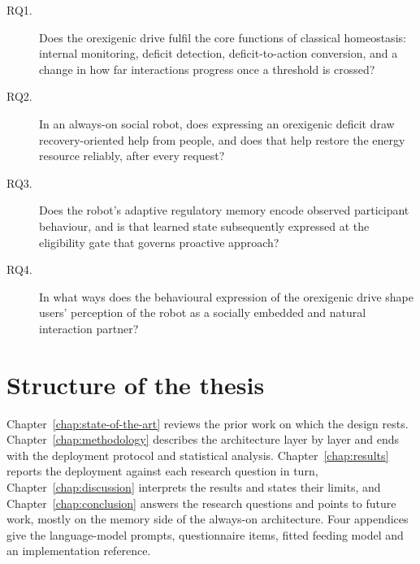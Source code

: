 \begin{description}
    \item[RQ1.] Does the orexigenic drive fulfil the core functions of classical homeostasis: internal monitoring, deficit detection, deficit-to-action conversion, and a change in how far interactions progress once a threshold is crossed?
    \item[RQ2.] In an always-on social robot, does expressing an orexigenic deficit draw recovery-oriented help from people, and does that help restore the energy resource reliably, after every request?
    \item[RQ3.] Does the robot's adaptive regulatory memory encode observed participant behaviour, and is that learned state subsequently expressed at the eligibility gate that governs proactive approach?
    \item[RQ4.] In what ways does the behavioural expression of the orexigenic drive shape users' perception of the robot as a socially embedded and natural interaction partner?
\end{description}

\section{Structure of the thesis}
\label{sec:intro-thesis-structure}

Chapter~\ref{chap:state-of-the-art} reviews the prior work on which the design rests. Chapter~\ref{chap:methodology} describes the architecture layer by layer and ends with the deployment protocol and statistical analysis. Chapter~\ref{chap:results} reports the deployment against each research question in turn, Chapter~\ref{chap:discussion} interprets the results and states their limits, and Chapter~\ref{chap:conclusion} answers the research questions and points to future work, mostly on the memory side of the always-on architecture. Four appendices give the language-model prompts, questionnaire items, fitted feeding model and an implementation reference.
